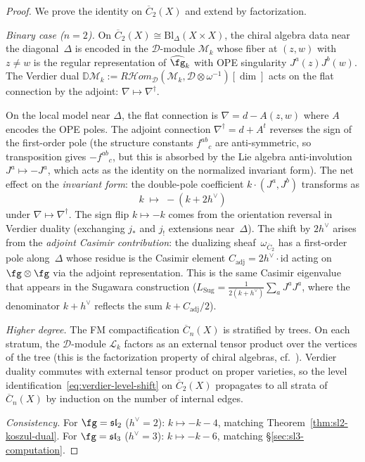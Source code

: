\begin{proof}
We prove the identity on $\overline{C}_2(X)$ and extend by
factorization.

\emph{Binary case \textup{(}$n = 2$\textup{)}.}
On $\overline{C}_2(X) \cong \mathrm{Bl}_\Delta(X \times X)$, the
chiral algebra data near the diagonal~$\Delta$ is encoded in the
$\mathcal{D}$-module $\mathcal{M}_k$ whose fiber at
$(z,w)$ with $z \neq w$ is the regular representation of
$\widehat{\fg}_k$ with OPE singularity $J^a(z) J^b(w)$.
The Verdier dual $\mathbb{D}\mathcal{M}_k :=
R\mathcal{H}\!\mathit{om}_{\mathcal{D}}
(\mathcal{M}_k, \mathcal{D} \otimes \omega^{-1})[\dim]$
acts on the flat connection by the adjoint:
$\nabla \mapsto \nabla^\dagger$.

On the local model near $\Delta$, the flat connection is
$\nabla = d - A(z,w)$ where $A$ encodes the OPE poles.
The adjoint connection $\nabla^\dagger = d + A^t$ reverses the
sign of the first-order pole (the structure constants
$f^{ab}{}_c$ are anti-symmetric, so transposition gives
$-f^{ab}{}_c$, but this is absorbed by the Lie algebra
anti-involution $J^a \mapsto -J^a$, which acts as the identity
on the normalized invariant form).
The net effect on the \emph{invariant form}:
the double-pole coefficient $k \cdot (J^a, J^b)$ transforms as
\begin{equation}\label{eq:adjoint-casimir}
k \;\longmapsto\; -(k + 2h^\vee)
\end{equation}
under $\nabla \mapsto \nabla^\dagger$. The sign flip
$k \mapsto -k$ comes from the orientation reversal in Verdier
duality (exchanging $j_*$ and $j_!$ extensions near~$\Delta$).
The shift by $2h^\vee$ arises from the \emph{adjoint Casimir
contribution}: the dualizing sheaf~$\omega_{\overline{C}_2}$
has a first-order pole along~$\Delta$ whose residue is the
Casimir element $C_{\mathrm{adj}} = 2h^\vee \cdot \mathrm{id}$
acting on $\fg \otimes \fg$ via the adjoint representation.
This is the same Casimir eigenvalue that appears in the
Sugawara construction
($L_{\mathrm{Sug}} = \tfrac{1}{2(k+h^\vee)} \sum_a J^a J^a$,
where the denominator $k + h^\vee$ reflects the sum $k + C_{\mathrm{adj}}/2$).

\emph{Higher degree.}
The FM compactification $\overline{C}_n(X)$ is stratified by trees.
On each stratum, the $\mathcal{D}$-module $\mathcal{L}_k$ factors
as an external tensor product over the vertices of the tree
(this is the factorization property of chiral algebras,
cf.\ \cite[\S3.4]{BD04}).
Verdier duality commutes with external tensor product on proper
varieties, so the level identification~\eqref{eq:verdier-level-shift}
on $\overline{C}_2(X)$ propagates to all strata of
$\overline{C}_n(X)$ by induction on the number of internal edges.

\emph{Consistency.}
For $\fg = \mathfrak{sl}_2$ ($h^\vee = 2$):
$k \mapsto -k - 4$, matching
Theorem~\ref{thm:sl2-koszul-dual}.
For $\fg = \mathfrak{sl}_3$ ($h^\vee = 3$):
$k \mapsto -k - 6$, matching
\S\ref{sec:sl3-computation}.
\end{proof}

